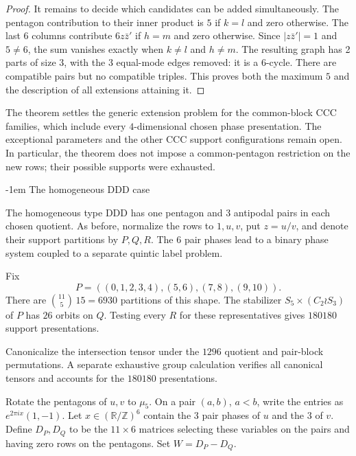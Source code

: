 \documentclass[11pt,a4paper]{article}
\makeatletter
\theoremstyle{plain}
\theoremstyle{definition}
\theoremstyle{plain}
\renewcommand\subsection{\@startsection{subsection}{2}{\z@}  {\medskipamount}  {-1em}  {\normalfont\normalsize\bfseries}}
\makeatother
\begin{document}
\begin{proof}
It remains to decide which candidates can be added simultaneously. The pentagon contribution to their inner product is $5$ if $k=l$ and zero otherwise. The last 6 columns contribute $6z\bar z'$ if $h=m$ and zero otherwise. Since $|z\bar z'|=1$ and $5\ne6$, the sum vanishes exactly when $k\ne l$ and $h\ne m$. The resulting graph has 2 parts of size $3$, with the 3 equal-mode edges removed: it is a $6$-cycle. There are compatible pairs but no compatible triples. This proves both the maximum $5$ and the description of all extensions attaining it.
\end{proof}

The theorem settles the generic extension problem for the common-block $\mathrm{CCC}$ families, which include every $4$-dimensional chosen phase presentation. The exceptional parameters and the other $\mathrm{CCC}$ support configurations remain open. In particular, the theorem does not impose a common-pentagon restriction on the new rows; their possible supports were exhausted.


\subsection{The homogeneous DDD case}\label{sec:DDD}

\medskip
The homogeneous type $\mathrm{DDD}$ has one pentagon and 3 antipodal pairs in each chosen quotient. As before, normalize the rows to $1,u,v$, put $z=u/v$, and denote their support partitions by $P,Q,R$. The 6 pair phases lead to a binary phase system coupled to a separate quintic label problem.

Fix
$$P=((0,1,2,3,4),(5,6),(7,8),(9,10)).$$
There are $\binom{11}{5}\,15=6930$ partitions of this shape. The stabilizer $S_5\times(C_2\wr S_3)$ of $P$ has $26$ orbits on $Q$. Testing every $R$ for these representatives gives $180180$ support presentations.

Canonicalize the intersection tensor under the $1296$ quotient and pair-block permutations. A separate exhaustive group calculation verifies all canonical tensors and accounts for the $180180$ presentations.

\medskip
Rotate the pentagons of $u,v$ to $\mu_5$. On a pair $(a,b)$, $a<b$, write the entries as $e^{2\pi i x}(1,-1)$. Let $x\in(\mathbb R/\mathbb{Z})^6$ contain the 3 pair phases of $u$ and the 3 of $v$. Define $D_P,D_Q$ to be the $11\times6$ matrices selecting these variables on the pairs and having zero rows on the pentagons. Set $W=D_P-D_Q$.
\end{document}
